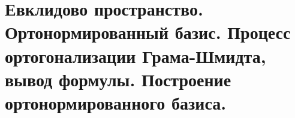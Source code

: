 \section{
    Евклидово пространство. Ортонормированный базис. Процесс ортогонализации Грама-Шмидта, вывод формулы. Построение ортонормированного базиса.
}




\newpage





\newpage



